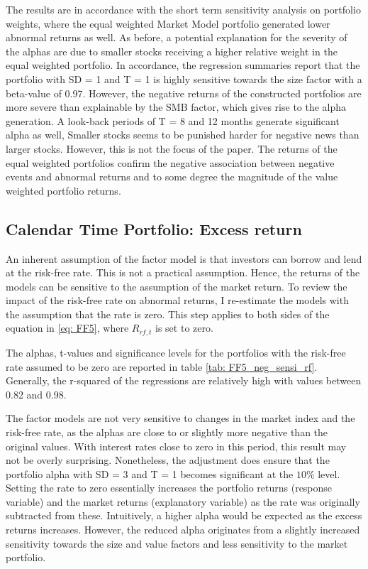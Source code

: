 The results are in accordance with the short term sensitivity analysis on portfolio weights, where the equal weighted Market Model portfolio generated lower abnormal returns as well. As before, a potential explanation for the severity of the alphas are due to smaller stocks receiving a higher relative weight in the equal weighted portfolio. In accordance, the regression summaries report that the portfolio with SD = 1 and T = 1 is highly sensitive towards the size factor with a beta-value of 0.97. However, the negative returns of the constructed portfolios are more severe than explainable by the SMB factor, which gives rise to the alpha generation. A look-back periods of T = 8 and 12 months generate significant alpha as well,  Smaller stocks seems to be punished harder for negative news than larger stocks. However, this is not the focus of the paper. The returns of the equal weighted portfolios confirm the negative association between negative events and abnormal returns and to some degree the magnitude of the value weighted portfolio returns.


\subsection{Calendar Time Portfolio: Excess return}

An inherent assumption of the factor model is that investors can borrow and lend at the risk-free rate. This is not a practical assumption. Hence, the returns of the models can be sensitive to the assumption of the market return. 
To review the impact of the risk-free rate on abnormal returns, I re-estimate the models with the assumption that the rate is zero. This step applies to both sides of the equation in \ref{eq: FF5}, where $R_{rf,t}$ is set to zero. 

The alphas, t-values and significance levels for the portfolios with the risk-free rate assumed to be zero are reported in table \ref{tab: FF5_neg_sensi_rf}. Generally, the r-squared of the regressions are relatively high with values between 0.82 and 0.98. 

The factor models are not very sensitive to changes in the market index and the risk-free rate, as the alphas are close to or slightly more negative than the original values.  With interest rates close to zero in this period, this result may not be overly surprising. Nonetheless, the adjustment does ensure that the portfolio alpha with SD = 3 and T = 1 becomes significant at the $10\%$ level. Setting the rate to zero essentially increases the portfolio returns (response variable) and the market returns (explanatory variable) as the rate was originally subtracted from these. Intuitively, a higher alpha would be expected as the excess returns increases.  However, the reduced alpha originates from a slightly increased sensitivity towards the size and value factors and less sensitivity to the market portfolio.      



